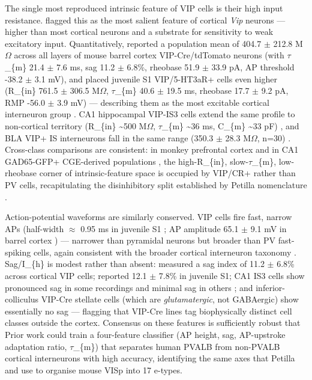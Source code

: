 \documentclass[11pt]{article}
\begin{document}
The single most reproduced intrinsic feature of VIP cells is their high input resistance. \citet{Tremblay2016} flagged this as the most salient feature of cortical \textit{Vip} neurons --- higher than most cortical neurons and a substrate for sensitivity to weak excitatory input. Quantitatively, \citet{Pronneke2015} reported a population mean of 404.7 $\pm$ 212.8 M$\Omega$ across all layers of mouse barrel cortex VIP-Cre/tdTomato neurons (with $\tau$\_\{m\} 21.4 $\pm$ 7.6 ms, sag 11.2 $\pm$ 6.8\%, rheobase 51.9 $\pm$ 33.9 pA, AP threshold -38.2 $\pm$ 3.1 mV), and \citet{Vucurovic2010} placed juvenile S1 VIP/5-HT3aR+ cells even higher (R\_\{in\} 761.5 $\pm$ 306.5 M$\Omega$, $\tau$\_\{m\} 40.6 $\pm$ 19.5 ms, rheobase 17.7 $\pm$ 9.2 pA, RMP -56.0 $\pm$ 3.9 mV) --- describing them as the most excitable cortical interneuron group \citep{Vucurovic2010}. CA1 hippocampal VIP-IS3 cells extend the same profile to non-cortical territory (R\_\{in\} {\textasciitilde}500 M$\Omega$, $\tau$\_\{m\} {\textasciitilde}36 ms, C\_\{m\} {\textasciitilde}33 pF) \citep{Michaud2024, Guetmccreight2020b}, and BLA VIP+ IS interneurons fall in the same range (350.3 $\pm$ 28.3 M$\Omega$, n=30) \citep{Rhomberg2018}. Cross-class comparisons are consistent: in monkey prefrontal cortex \citep{Zaitsev2009} and in CA1 GAD65-GFP+ CGE-derived populations \citep{Wierenga2010}, the high-R\_\{in\}, slow-$\tau$\_\{m\}, low-rheobase corner of intrinsic-feature space is occupied by VIP/CR+ rather than PV cells, recapitulating the disinhibitory split established by Petilla nomenclature \citep{Thepetillainterneuronnomenclaturegroupping2008}.

Action-potential waveforms are similarly conserved. VIP cells fire fast, narrow APs (half-width $\approx$ 0.95 ms in juvenile S1 \citep{Vucurovic2010}; AP amplitude 65.1 $\pm$ 9.1 mV in barrel cortex \citep{Pronneke2015}) --- narrower than pyramidal neurons but broader than PV fast-spiking cells, again consistent with the broader cortical interneuron taxonomy \citep{Rudy2011, Karnani2016a}. Sag/I\_\{h\} is modest rather than absent: \citet{Pronneke2015} measured a sag index of 11.2 $\pm$ 6.8\% across cortical VIP cells; \citet{Vucurovic2010} reported 12.1 $\pm$ 7.8\% in juvenile S1; CA1 IS3 cells show pronounced sag in some recordings and minimal sag in others \citep{Bell2015, Michaud2024}; and inferior-colliculus VIP-Cre stellate cells (which are \textit{glutamatergic}, not GABAergic) show essentially no sag \citep{Goyer2019} --- flagging that VIP-Cre lines tag biophysically distinct cell classes outside the cortex. Consensus on these features is sufficiently robust that Prior work \citep{Kim2023} could train a four-feature classifier (AP height, sag, AP-upstroke adaptation ratio, $\tau$\_\{m\}) that separates human PVALB from non-PVALB cortical interneurons with high accuracy, identifying the same axes that Petilla and \citet{Gouwens2019} use to organise mouse VISp into 17 e-types.
\end{document}
